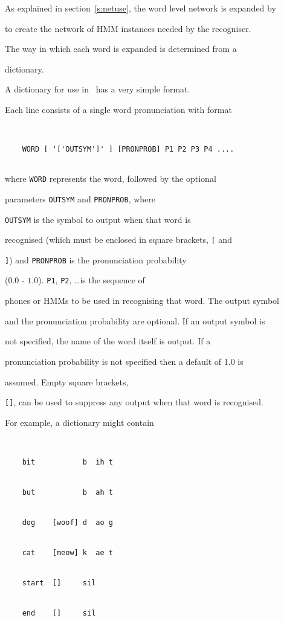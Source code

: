 




As explained in section~\ref{s:netuse}, the word level network is expanded by


 to create the network of HMM instances needed by the recogniser.


The way in which each word is expanded is determined from a


dictionary.





A dictionary for use in \HTK\ has a very simple format.


Each line consists of a single word pronunciation with format


\begin{verbatim}


    WORD [ '['OUTSYM']' ] [PRONPROB] P1 P2 P3 P4 ....


\end{verbatim}


where \texttt{WORD} represents the word, followed by the optional


parameters \texttt{OUTSYM} and \texttt{PRONPROB}, where


\texttt{OUTSYM} is the symbol to output when that word is


recognised (which must be enclosed in square brackets, \verb|[| and


\verb|]|) and \texttt{PRONPROB} is the pronunciation probability


($0.0$ - $1.0$).  \texttt{P1}, \texttt{P2}, \ldots is the sequence of


phones or HMMs to be used in recognising that word. The output symbol


and the pronunciation probability are optional. If an output symbol is


not specified, the name of the word itself is output. If a


pronunciation probability is not specified then a default of 1.0 is


assumed.  Empty square brackets,


\texttt{[]}, can be used to suppress any output when that word is recognised.


For example, a dictionary might contain


\begin{verbatim}


    bit           b  ih t 


    but           b  ah t


    dog    [woof] d  ao g


    cat    [meow] k  ae t


    start  []     sil


    end    []     sil


\end{verbatim}





